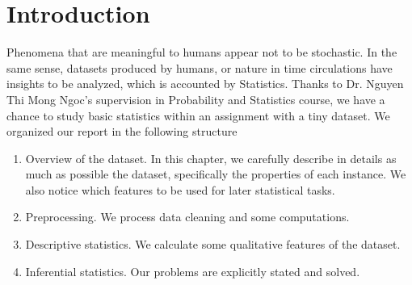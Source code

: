 \chapter*{Introduction}

Phenomena that are meaningful to humans appear not to be stochastic. In the same sense, datasets produced by humans, or nature in time circulations have insights to be analyzed, which is accounted by Statistics. Thanks to Dr. Nguyen Thi Mong Ngoc's supervision in Probability and Statistics course, we have a chance to study basic statistics within an assignment with a tiny dataset. We organized our report in the following structure

\begin{enumerate}
  \item Overview of the dataset. In this chapter, we carefully describe in details as much as possible the dataset, specifically the properties of each instance. We also notice which features to be used for later statistical tasks.
  \item Preprocessing. We process data cleaning and some computations.
  \item Descriptive statistics. We calculate some qualitative features of the dataset.
  \item Inferential statistics. Our problems are explicitly stated and solved.
\end{enumerate}